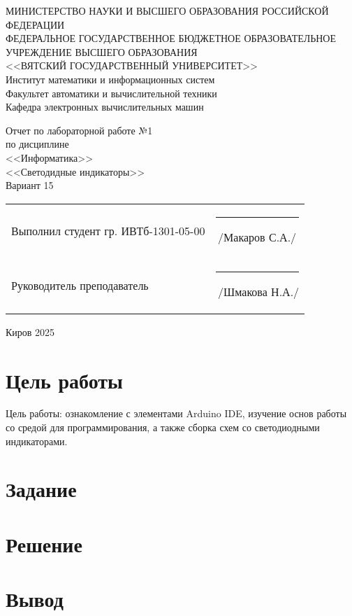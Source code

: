 \documentclass[a4paper, 14pt]{extarticle}
\begin{document}
  \newpage\thispagestyle{empty}
  \begin{center}
    \MakeUppercase{
      Министерство науки и высшего образования Российской Федерации\\
      Федеральное государственное бюджетное образовательное учреждение высшего образования\\
      <<Вятский Государственный Университет>>\\
    }
    Институт математики и информационных систем\\
    Факультет автоматики и вычислительной техники\\
    Кафедра электронных вычислительных машин
  \end{center}
  \vfill
  
  \begin{center}
    Отчет по лабораторной работе №1\\
    по дисциплине\\
    <<Информатика>>\\
    <<Светодидные индикаторы>>\\
    Вариант 15
  \end{center}
  \vfill
  
  \noindent
  \begin{tabular}{ll}
    Выполнил студент гр. ИВТб-1301-05-00 \hspace{5mm} &
    \rule[-1mm]{25mm}{0.10mm}\,/Макаров С.А./\\
    
    Руководитель преподаватель & \rule[-1mm]{25mm}{0.10mm}\,/Шмакова Н.А./\\
  \end{tabular}
  
  \vfill
  \begin{center}
    Киров 2025
  \end{center}

  \newpage
  \section*{\hspace{12.5mm}Цель работы}
  Цель работы: ознакомление с элементами Arduino IDE, изучение основ
  работы со средой для программирования, а также сборка схем со
  светодиодными индикаторами.

  \section*{\hspace{12.5mm}Задание}

  \section*{\hspace{12.5mm}Решение}

  \section*{\hspace{12.5mm}Вывод}
\end{document}

